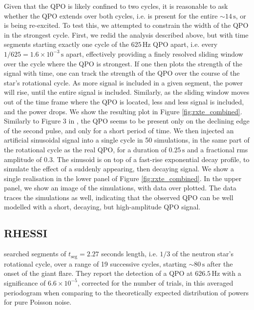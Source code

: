 \documentclass{emulateapj}
\begin{document}
Given that the QPO is likely confined to two cycles, it is reasonable to ask whether the QPO extends over both cycles, i.e. is present for the entire $\sim 14\, \mathrm{s}$, or is being re-excited. To test this, we attempted to constrain the width of the QPO in the strongest cycle. First, we redid the analysis described above, but with time segments starting exactly one cycle of the $625 \, \mathrm{Hz}$ QPO apart, i.e. every $1/625 = 1.6 \times 10^{-3} \, \mathrm{s}$ apart, effectively providing a finely resolved sliding window over the cycle where the QPO is strongest. If one then plots the strength of the signal with time, one can track the strength of the QPO over the course of the star's rotational cycle. As more signal is included in a given segment, the power will rise, until the entire signal is included. Similarly, as the sliding window moves out of the time frame where the QPO is located, less and less signal is included, and the power drops. We show the resulting plot in Figure \ref{fig:rxte_combined}. Similarly to Figure 3 in \citet{Strohmayer06}, the QPO seems to be present only on the declining edge of the second pulse, and only for a short period of time. We then injected an artificial sinusoidal signal into a single cycle in 50 simulations, in the same part of the rotational cycle as the real QPO, for a duration of $0.25\, \mathrm{s}$ and a fractional rms amplitude of $0.3$. The sinusoid is on top of a fast-rise exponential decay profile, to simulate the effect of a suddenly appearing, then decaying signal. We show a single realisation in the lower panel of Figure \ref{fig:rxte_combined}. In the upper panel, we show an image of the simulations, with data over plotted. The data traces the simulations as well, indicating that the observed QPO can be well modelled with a short, decaying, but high-amplitude QPO signal. 


\subsection{RHESSI}
\label{sec:rhessi_results}

\citealt{Watts06} searched segments of $t_{\mathrm{seg}} = 2.27$ seconds length, i.e. $1/3$ of the neutron star's rotational cycle, over a range of 19 successive cycles, starting $\sim 80 \, \mathrm{s}$ after the onset of the giant flare. They report the detection of a QPO at $626.5 \, \mathrm{Hz}$ with a significance of $6.6 \times 10^{-5}$, corrected for the number of trials, in this averaged periodogram when comparing to the theoretically expected distribution of powers for pure Poisson noise.
\end{document}
